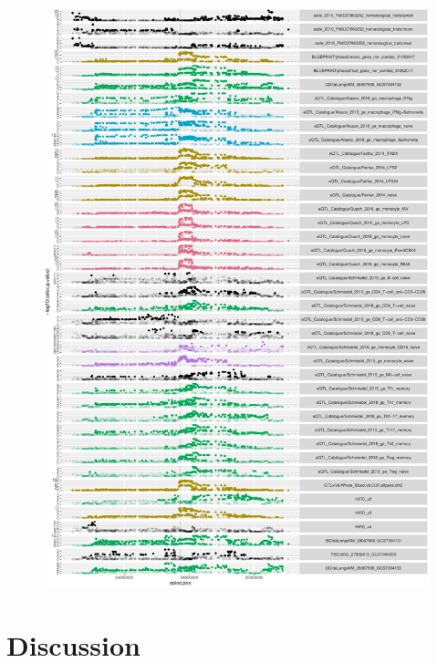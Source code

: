 \begin{figure}
    \centering
    \includegraphics[width=1.0\textwidth,page=1]{mainmatter/figures/chapter_03/perform_coloc.locusPlot.gene_ENSG00000138031.pdf}
    \caption{}
    \label{fig:hird_eQTL_coloc_ADCY3}
\end{figure}

\section{Discussion}


